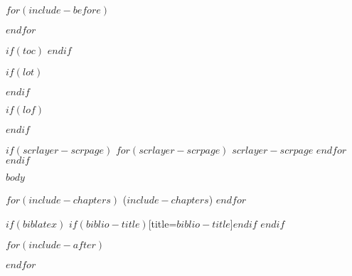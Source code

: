 \documentclass[$if(fontsize)$$fontsize$,$endif$$if(lang)$$lang$,$endif$$if(papersize)$$papersize$,$endif$$for(classoption)$$classoption$$sep$,$endfor$]{$documentclass$}
\begin{document}
\frontmatter

$for(include-before)$
  
$endfor$

\clearpage

$if(toc)$
  \renewcommand*\contentsname{Inhaltsverzeichnis}
  \hypersetup{linkcolor=black}
    \setcounter{tocdepth}{$toc-depth$}
    \tableofcontents
    \pagestyle{plain}
    \cleardoublepage
$endif$

$if(lot)$
  \renewcommand*\listtablename{Tabellenverzeichnis}
    \listoftables
  \restoregeometry
  \clearpage
$endif$

$if(lof)$
  \renewcommand*\listfigurename{Abbildungsverzeichnis}
    \listoffigures
  \restoregeometry
$endif$

$if(scrlayer-scrpage)$
  $for(scrlayer-scrpage)$
    $scrlayer-scrpage$
  $endfor$
$endif$

\mainmatter

$body$

$for(include-chapters)$
  ($include-chapters$)
$endfor$

$if(biblatex)$
  \printbibliography$if(biblio-title)$[title=$biblio-title$]$endif$
$endif$

\backmatter

$for(include-after)$
  
$endfor$
\end{document}
